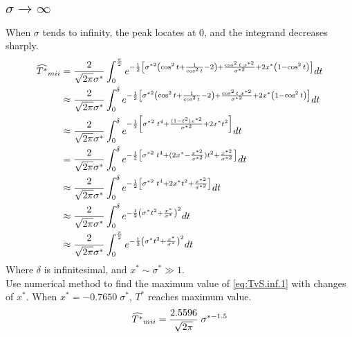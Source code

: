 \documentclass[review, 1p, number, sort&compress,table]{elsarticle}
\begin{document}
	\subsection{$\sigma\rightarrow{\infty}$}
	When $\sigma$ tends to infinity, the peak locates at $0$, and the integrand decreases sharply. 	
		\begin{align} \label{eq:TvS.inf.1}
		\nonumber 
		\widehat{T^{*}}_{m\uppercase\expandafter{\romannumeral2}} &=\frac{2}{\sqrt{2\pi}\sigma^*}\int_{0}^{\frac{\pi}{2}} e^{-\frac{1}{2}\left[\sigma^{*2}\left(\cos^2{t}+\frac{1}{\cos^2{t}}-2 \right)+\frac{\cos^2{t} \; x^{*2}}{\sigma^{*2}}+2x^{*}\left( 1-\cos^2{t} \right)\right] }dt
		\\ \nonumber
		&\approx  \frac{2}{\sqrt{2\pi}\sigma^*}\int_{0}^{\delta} e^{-\frac{1}{2}\left[\sigma^{*2}\left(\cos^2{t}+\frac{1}{\cos^2{t}}-2 \right)+\frac{\cos^2{t} \; x^{*2} }{\sigma^{*2}}+2x^{*}\left( 1-\cos^2{t} \right)\right] }dt
		\\ \nonumber
		&\approx  \frac{2}{\sqrt{2\pi}\sigma^*}\int_{0}^{\delta} e^{-\frac{1}{2}\left[\sigma^{*2}\;t^4+\frac{(1-t^2)x^{*2} }{\sigma^{*2}}+2x^{*}t^2 \right] }dt
		\\ \nonumber		
		&= \frac{2}{\sqrt{2\pi}\sigma^*}\int_{0}^{\delta} e^{-\frac{1}{2}\left[\sigma^{*2}\;t^4+(2x^{*}-\frac{x^{*2}}{\sigma^{*2}})t^2 +\frac{x^{*2}}{\sigma^{*2}}\right] }dt
		\\ \nonumber
		&\approx \frac{2}{\sqrt{2\pi}\sigma^*}\int_{0}^{\delta} e^{-\frac{1}{2}\left[\sigma^{*2}\;t^4+2x^{*}t^2 +\frac{x^{*2}}{\sigma^{*2}}\right] }dt
		\\ \nonumber
		&\approx \frac{2}{\sqrt{2\pi}\sigma^*}\int_{0}^{\delta} e^{-\frac{1}{2}\left(\sigma^{*}t^2+\frac{x^{*}}{\sigma^{*}}\right)^2 }dt
       \\ 
       	&\approx \frac{2}{\sqrt{2\pi}\sigma^*}\int_{0}^{\frac{\pi}{2}} e^{-\frac{1}{2}\left(\sigma^{*}t^2+\frac{x^{*}}{\sigma^{*}}\right)^2 }dt
		\end{align}
	Where $\delta$ is infinitesimal, and $x^{*} \sim \sigma^{*} \gg 1$.
	\\
	Use numerical method to find the maximum value of \autoref{eq:TvS.inf.1} with changes of $x^{*}$. When $x^{*}=-0.7650 \;\sigma^{*}$, $T^{*}$ reaches maximum value.
		\begin{equation} \label{eq:TvS.inf}
			\widehat{T^{*}}_{m\uppercase\expandafter{\romannumeral2}}= \frac{2.5596}{\sqrt{2\pi}} \; \sigma^{*-1.5}
		\end{equation}
\end{document}
